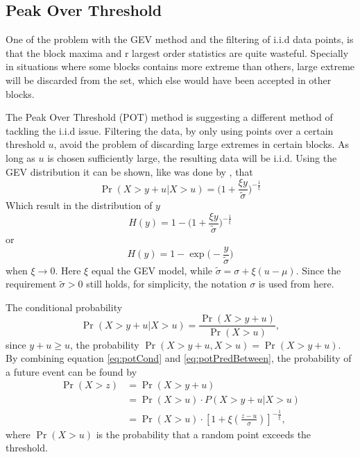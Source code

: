 \subsection{Peak Over Threshold} 
One of the problem with the GEV method and the filtering of i.i.d data points, is that the block maxima and r largest order statistics are quite wasteful. Specially in situations where some blocks contains more extreme than others, large extreme will be discarded from the set, which else would have been accepted in other blocks.

The Peak Over Threshold (POT) method is suggesting a different method of tackling the i.i.d issue. Filtering the data, by only using points over a certain threshold $u$, avoid the problem of discarding large extremes in certain blocks. As long as $u$ is chosen sufficiently large, the resulting data will be i.i.d. Using the GEV distribution it can be shown, like was done by \cite[p.~76]{stuart}, that 
\begin{equation}
\label{eq:potCond}
\Pr(X>y+u|X>u)=\Big(1+\frac{\xi y}{\tilde{\sigma}}\Big)^{-\frac{1}{\xi}}
\end{equation}
Which result in the distribution of $y$
\begin{equation}
\label{eq:potwxi}
H(y)=1-\Big(1+\frac{\xi y}{\tilde{\sigma}}\Big)^{-\frac{1}{\xi}}
\end{equation}  
or
\begin{equation}
\label{eq:potwoxi}
H(y)=1-\exp\Big(-\frac{y}{\tilde{\sigma}}\Big)
\end{equation}
when $\xi \to 0$. Here $\xi$ equal the GEV model, while $\tilde{\sigma}=\sigma+\xi(u-\mu)$. Since the requirement $\tilde{\sigma}>0$ still holds, for simplicity, the notation $\sigma$ is used from here.   

The conditional probability
\begin{equation}
\label{eq:potPredBetween}
\Pr(X>y+u|X>u)=\frac{\Pr(X>y+u)}{\Pr(X>u)}, 
\end{equation}
since $y+u \geq u$, the probability $\Pr(X>y+u, X>u)=\Pr(X>y+u)$.
By combining equation \eqref{eq:potCond} and \eqref{eq:potPredBetween}, the probability of a future event can be found by
\begin{align}
\Pr(X>z)&=\Pr(X>y+u) \nonumber\\
 		&=\Pr(X>u) \cdot P(X>y+u|X>u)\nonumber\\
 		&=\Pr(X>u) \cdot \left[1+\xi \left( \frac{z-u}{\sigma}\right)\right]^{-\frac{1}{\xi}}, \label{eq:potPred}
\end{align}
where $\Pr(X>u)$ is the probability that a random point exceeds the threshold.

